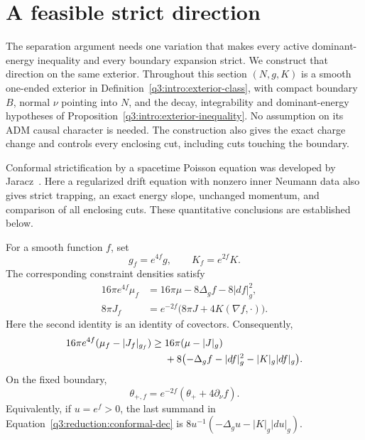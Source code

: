 \section{A feasible strict direction}
\label{q3:strict:section}

The separation argument needs one variation that makes every active
dominant-energy inequality and every boundary expansion strict.
We construct that direction on the same exterior.  Throughout this
section $(N,g,K)$ is a smooth one-ended exterior in
Definition~\ref{q3:intro:exterior-class}, with compact boundary $B$,
normal $\nu$ pointing into $N$, and the decay, integrability and
dominant-energy hypotheses of Proposition~\ref{q3:intro:exterior-inequality}.
No assumption on its ADM causal character is needed.
The construction also gives the exact charge change and controls every
enclosing cut, including cuts touching the boundary.


Conformal strictification by a spacetime Poisson equation was developed
by Jaracz~\cite{Jaracz2025StrictDEC}. Here a regularized drift equation
with nonzero inner Neumann data also gives strict trapping, an exact
energy slope, unchanged momentum, and comparison of all enclosing cuts.
These quantitative conclusions are established below.

\begin{lemma}
\label{q3:reduction:conformal-formulas}
For a smooth function $f$, set
\[
 g_f=e^{4f}g,\qquad K_f=e^{2f}K.
\]
The corresponding constraint densities satisfy
\begin{align}
 16\pi e^{4f}\mu_f
   &=16\pi\mu-8\Delta_g f-8|df|_g^2,
       \label{q3:reduction:conformal-energy}\\
 8\pi J_f
   &=e^{-2f}\bigl(8\pi J+4K(\nabla f,\cdot)\bigr).
       \label{q3:reduction:conformal-momentum}
\end{align}
Here the second identity is an identity of covectors.  Consequently,
\begin{align}
 16\pi e^{4f}(\mu_f-|J_f|_{g_f})
 \ge{}&16\pi(\mu-|J|_g)\notag\\
 &+8\bigl(-\Delta_g f-|df|_g^2-|K|_g|df|_g\bigr).
       \label{q3:reduction:conformal-dec}
\end{align}
On the fixed boundary,
\begin{equation}
 \theta_{+,f}=e^{-2f}(\theta_++4\partial_\nu f).
       \label{q3:reduction:conformal-expansion}
\end{equation}
Equivalently, if $u=e^f>0$, the last summand in
Equation~\eqref{q3:reduction:conformal-dec} is
$8u^{-1}(-\Delta_g u-|K|_g|du|_g)$.
\end{lemma}

